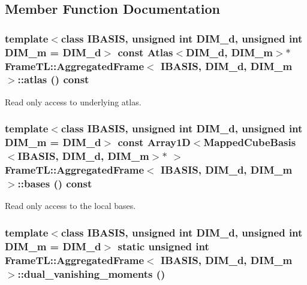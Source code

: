 \subsection{Member Function Documentation}
\hypertarget{classFrameTL_1_1AggregatedFrame_ae0fa43f9093358f1ae2fdda963330a8}{
\subsubsection[{atlas}]{\setlength{\rightskip}{0pt plus 5cm}template$<$class IBASIS, unsigned int DIM\_\-d, unsigned int DIM\_\-m = DIM\_\-d$>$ const Atlas$<$DIM\_\-d, DIM\_\-m$>$$\ast$ {\bf FrameTL::AggregatedFrame}$<$ IBASIS, DIM\_\-d, DIM\_\-m $>$::atlas () const}}
\label{classFrameTL_1_1AggregatedFrame_ae0fa43f9093358f1ae2fdda963330a8}


Read only access to underlying atlas. \hypertarget{classFrameTL_1_1AggregatedFrame_6d03811d3fe631364a5ab927425c466e}{
\subsubsection[{bases}]{\setlength{\rightskip}{0pt plus 5cm}template$<$class IBASIS, unsigned int DIM\_\-d, unsigned int DIM\_\-m = DIM\_\-d$>$ const Array1D$<$MappedCubeBasis$<$IBASIS, DIM\_\-d, DIM\_\-m$>$$\ast$ $>$ {\bf FrameTL::AggregatedFrame}$<$ IBASIS, DIM\_\-d, DIM\_\-m $>$::bases () const}}
\label{classFrameTL_1_1AggregatedFrame_6d03811d3fe631364a5ab927425c466e}


Read only access to the local bases. \hypertarget{classFrameTL_1_1AggregatedFrame_2716c6746c81fa02f22a43ef43b98ffc}{
\subsubsection[{dual\_\-vanishing\_\-moments}]{\setlength{\rightskip}{0pt plus 5cm}template$<$class IBASIS, unsigned int DIM\_\-d, unsigned int DIM\_\-m = DIM\_\-d$>$ static unsigned int {\bf FrameTL::AggregatedFrame}$<$ IBASIS, DIM\_\-d, DIM\_\-m $>$::dual\_\-vanishing\_\-moments ()}}
\label{classFrameTL_1_1AggregatedFrame_2716c6746c81fa02f22a43ef43b98ffc}


